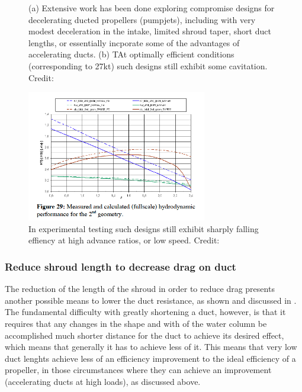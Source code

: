 \documentclass{article}\usepackage[]{graphicx}\usepackage[]{color}
\begin{document}
\begin{figure}[h]
\caption{(a) Extensive work has been done exploring compromise designs for decelerating ducted propellers (pumpjets), including with very modest deceleration in the intake, limited shroud taper, short duct lengths, or essentially incporate some of the advantages of accelerating ducts. (b) TAt optimally efficient conditions (corresponding to 27kt) such designs still exhibit some cavitation. Credit: \cite{abdel2010}}
\label{fig:FineOptimised.png}
\end{figure}

\begin{figure}[h]
\captionsetup{width=0.7\textwidth}
\includegraphics[width=0.7\textwidth, center]{FineEfficiency.png}
\caption{In experimental testing such designs still exhibit sharply falling effiency at high advance ratios, or low speed. Credit:  \cite{abdel2010}}
\label{fig:FineEfficiency.png}
\end{figure}


\subsubsection{Reduce shroud length to decrease drag on duct}
The reduction of the length of the shroud in order to reduce drag presents another possible means to lower the duct resistance, as shown and discussed in \cite[21-25]{oosterveld1970}. The fundamental difficulty with greatly shortening a duct, however, is that it requires that any changes in the shape and with of the water column be accomplished much shorter distance for the duct to achieve its desired effect, which means that generally it has to achieve less of it.  This means that very low duct lenghts achieve less of an efficiency improvement to the ideal efficiency of a propeller, in those circumstances where they can achieve an improvement  (accelerating ducts at high loads), as discussed above.
\end{document}
